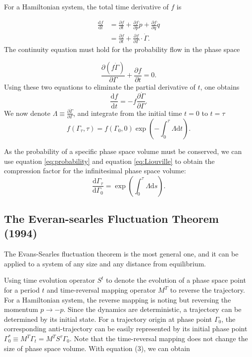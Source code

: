 \documentclass[ reprint, amsmath,amssymb, aps,]{revtex4-1}
\begin{document}
For a Hamiltonian system, the total time derivative of $f$ is 

\begin{equation}\label{eq:probability}
\begin{split}
\frac{\mathrm{d}f}{\mathrm{d}t}
&=\frac{\partial f}{\partial t}+\frac{\partial f}{\partial p}\dot{p}+\frac{\partial f}{\partial q}\dot{q}\\
&=\frac{\partial f}{\partial t}+\frac{\partial f}{\partial \Gamma}\cdot \dot\Gamma.
\end{split}
\end{equation}
The continuity equation must hold for the probability flow in the phase space

\begin{equation}
\frac{\partial (f\dot{\Gamma})}{\partial \Gamma}+\frac{\partial f}{\partial t}=0.
\end{equation}
Using these two equations to eliminate the partial derivative of $t$, one obtains
\begin{equation}
\frac{\mathrm{d} f}{\mathrm{d} t}=-f\frac{\partial \dot{\Gamma}}{\partial \Gamma}.
\end{equation}
We now denote $\Lambda \equiv\frac{\partial \dot\Gamma}{\partial \Gamma}$, and integrate from the initial time $t=0$ to  $t=\tau$
\begin{equation}\label{eq:Liouville}
f(\Gamma_\tau,\tau)=f\left(\Gamma_0,0\right)\exp\left(-\int_0^\tau \Lambda\mathrm{d}t\right).
\end{equation}

As the probability of a specific phase space volume must be conserved, we can use equation \ref{eq:probability} and equation \ref{eq:Liouville} to obtain the compression factor for the infinitesimal phase space volume:
\begin{equation}
\frac{\mathrm{d}\Gamma_\tau}{\mathrm{d}\Gamma_0}=\exp\left(\int_0^\tau\Lambda\mathrm{d}s\right).
\end{equation}

\subsection{The Everan-searles Fluctuation Theorem (1994)}

The Evans-Searles fluctuation theorem is the most general one, and it can be applied to a system of any size and any distance from equilibrium.

Using time evolution operator $S^t$ to denote the evolution of a phase space point for a period $t$ and time-reversal mapping operator $M^T$ to reverse the trajectory. For a Hamiltonian system, the reverse mapping is noting but reversing the momentum $p\to -p$. Since the dynamics are deterministic, a trajectory can be determined by its initial state. For a trajectory origin at phase point $\Gamma_0$, the corresponding anti-trajectory can be easily represented by its initial phase point $\Gamma^*_0 \equiv M^T\Gamma_t=M^T S^\tau\Gamma_0$. Note that the time-reversal mapping does not change the size of phase space volume. With equation (3), we can obtain
\end{document}
